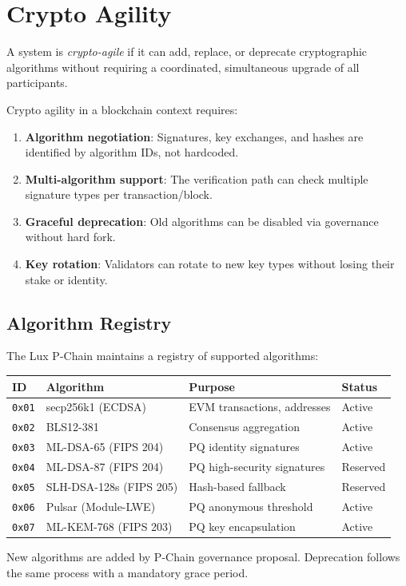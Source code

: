 \section{Crypto Agility}


\begin{definition}
A system is \emph{crypto-agile} if it can add, replace, or deprecate cryptographic algorithms without requiring a coordinated, simultaneous upgrade of all participants.
\end{definition}

Crypto agility in a blockchain context requires:

\begin{enumerate}[leftmargin=2em]
\item \textbf{Algorithm negotiation}: Signatures, key exchanges, and hashes are identified by algorithm IDs, not hardcoded.
\item \textbf{Multi-algorithm support}: The verification path can check multiple signature types per transaction/block.
\item \textbf{Graceful deprecation}: Old algorithms can be disabled via governance without hard fork.
\item \textbf{Key rotation}: Validators can rotate to new key types without losing their stake or identity.
\end{enumerate}

\subsection{Algorithm Registry}

The Lux P-Chain maintains a registry of supported algorithms:

\begin{center}
\begin{tabular}{llll}
\toprule
\textbf{ID} & \textbf{Algorithm} & \textbf{Purpose} & \textbf{Status} \\
\midrule
\texttt{0x01} & secp256k1 (ECDSA) & EVM transactions, addresses & Active \\
\texttt{0x02} & BLS12-381 & Consensus aggregation & Active \\
\texttt{0x03} & ML-DSA-65 (FIPS 204) & PQ identity signatures & Active \\
\texttt{0x04} & ML-DSA-87 (FIPS 204) & PQ high-security signatures & Reserved \\
\texttt{0x05} & SLH-DSA-128s (FIPS 205) & Hash-based fallback & Reserved \\
\texttt{0x06} & Pulsar (Module-LWE) & PQ anonymous threshold & Active \\
\texttt{0x07} & ML-KEM-768 (FIPS 203) & PQ key encapsulation & Active \\
\bottomrule
\end{tabular}
\end{center}

New algorithms are added by P-Chain governance proposal. Deprecation follows the same process with a mandatory grace period.

